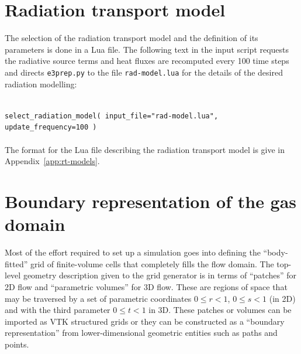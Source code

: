 \section{Radiation transport model}
\label{radiation-transport-sec}
%
The selection of the radiation transport model and the definition of its parameters
is done in a Lua file.
The following text in the input script requests the radiative source terms and heat fluxes
 are recomputed every 100 time steps and directs \texttt{e3prep.py} to the file \texttt{rad-model.lua} 
 for the details of the desired radiation modelling:

\noindent\topbar\\
\texttt{select\_radiation\_model( input\_file="rad-model.lua", update\_frequency=100 )} 
 \\
\bottombar\\

%
The format for the Lua file describing the radiation transport model is give in Appendix~\ref{app:rt-models}.

\newpage
\section{Boundary representation of the gas domain}
%
Most of the effort required to set up a simulation goes into defining the
``body-fitted'' grid of finite-volume cells that completely fills the flow
domain.
The top-level geometry description given to the grid generator is in terms of
``patches'' for 2D flow and ``parametric volumes'' for 3D flow.
These are regions of space that may be traversed by
a set of parametric coordinates $0 \le r < 1$, $0 \le s < 1$ (in 2D) and 
with the third parameter $0 \le t < 1$ in 3D.
These patches or volumes can be imported as VTK structured grids or they can be
constructed as a ``boundary representation'' from lower-dimensional 
geometric entities such as paths and points.

